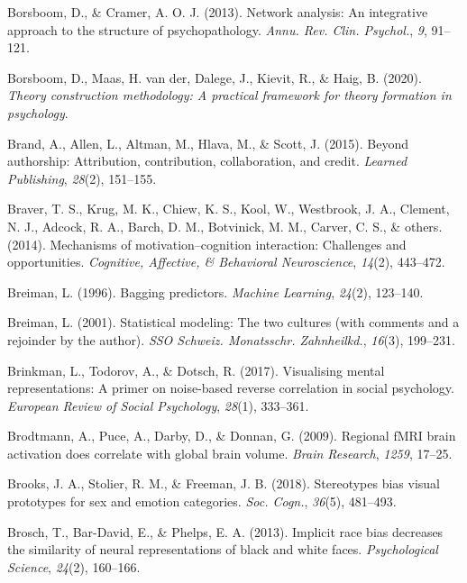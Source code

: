 \documentclass[11pt,american,]{memoir} %
\begin{document}
\leavevmode\hypertarget{ref-Borsboom2013-wb}{}%
Borsboom, D., \& Cramer, A. O. J. (2013). Network analysis: An integrative approach to the structure of psychopathology. \emph{Annu. Rev. Clin. Psychol.}, \emph{9}, 91--121.

\leavevmode\hypertarget{ref-Borsboom2020-xg}{}%
Borsboom, D., Maas, H. van der, Dalege, J., Kievit, R., \& Haig, B. (2020). \emph{Theory construction methodology: A practical framework for theory formation in psychology}.

\leavevmode\hypertarget{ref-brand2015beyond}{}%
Brand, A., Allen, L., Altman, M., Hlava, M., \& Scott, J. (2015). Beyond authorship: Attribution, contribution, collaboration, and credit. \emph{Learned Publishing}, \emph{28}(2), 151--155.

\leavevmode\hypertarget{ref-braver2014mechanisms}{}%
Braver, T. S., Krug, M. K., Chiew, K. S., Kool, W., Westbrook, J. A., Clement, N. J., Adcock, R. A., Barch, D. M., Botvinick, M. M., Carver, C. S., \& others. (2014). Mechanisms of motivation--cognition interaction: Challenges and opportunities. \emph{Cognitive, Affective, \& Behavioral Neuroscience}, \emph{14}(2), 443--472.

\leavevmode\hypertarget{ref-breiman1996bagging}{}%
Breiman, L. (1996). Bagging predictors. \emph{Machine Learning}, \emph{24}(2), 123--140.

\leavevmode\hypertarget{ref-Breiman2001-lf}{}%
Breiman, L. (2001). Statistical modeling: The two cultures (with comments and a rejoinder by the author). \emph{SSO Schweiz. Monatsschr. Zahnheilkd.}, \emph{16}(3), 199--231.

\leavevmode\hypertarget{ref-Brinkman2017-hg}{}%
Brinkman, L., Todorov, A., \& Dotsch, R. (2017). Visualising mental representations: A primer on noise-based reverse correlation in social psychology. \emph{European Review of Social Psychology}, \emph{28}(1), 333--361.

\leavevmode\hypertarget{ref-brodtmann2009regional}{}%
Brodtmann, A., Puce, A., Darby, D., \& Donnan, G. (2009). Regional fMRI brain activation does correlate with global brain volume. \emph{Brain Research}, \emph{1259}, 17--25.

\leavevmode\hypertarget{ref-Brooks2018-ao}{}%
Brooks, J. A., Stolier, R. M., \& Freeman, J. B. (2018). Stereotypes bias visual prototypes for sex and emotion categories. \emph{Soc. Cogn.}, \emph{36}(5), 481--493.

\leavevmode\hypertarget{ref-brosch2013implicit}{}%
Brosch, T., Bar-David, E., \& Phelps, E. A. (2013). Implicit race bias decreases the similarity of neural representations of black and white faces. \emph{Psychological Science}, \emph{24}(2), 160--166.
\end{document}
